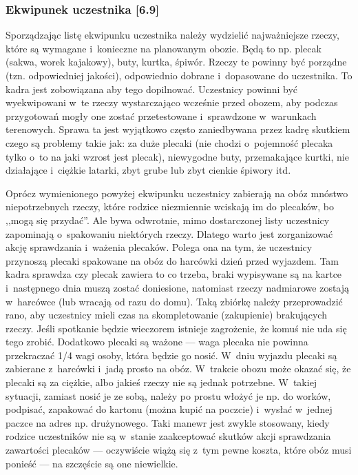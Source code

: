 \documentclass[a5paper,10pt,titlepage,twoside]{article}
\begin{document}
\subsubsection{Ekwipunek uczestnika [6.9]}
Sporządzając listę ekwipunku uczestnika należy wydzielić najważniejsze rzeczy, które są wymagane i~konieczne na planowanym obozie. Będą to np. plecak (sakwa, worek kajakowy), buty, kurtka, śpiwór. Rzeczy te powinny być porządne (tzn. odpowiedniej jakości), odpowiednio dobrane i~dopasowane do uczestnika. To kadra jest zobowiązana aby tego dopilnować. Uczestnicy powinni być wyekwipowani w~te rzeczy wystarczająco wcześnie przed obozem, aby podczas przygotowań mogły one zostać przetestowane i~sprawdzone w~warunkach terenowych. Sprawa ta jest wyjątkowo często zaniedbywana przez kadrę skutkiem czego są problemy takie jak: za duże plecaki (nie chodzi o~pojemność plecaka tylko o~to na jaki wzrost jest plecak), niewygodne buty, przemakające kurtki, nie działające i~ciężkie latarki, zbyt grube lub zbyt cienkie śpiwory itd.

Oprócz wymienionego powyżej ekwipunku uczestnicy zabierają na obóz mnóstwo niepotrzebnych rzeczy, które rodzice niezmiennie wciskają im do plecaków, bo ,,mogą się przydać''. Ale bywa odwrotnie, mimo dostarczonej listy uczestnicy zapominają o~spakowaniu niektórych rzeczy. Dlatego warto jest zorganizować akcję sprawdzania i~ważenia plecaków. Polega ona na tym, że uczestnicy przynoszą plecaki spakowane na obóz do harcówki dzień przed wyjazdem. Tam kadra sprawdza czy plecak zawiera to co trzeba, braki wypisywane są na kartce i~następnego dnia muszą zostać doniesione, natomiast rzeczy nadmiarowe zostają w~harcówce (lub wracają od razu do domu). Taką zbiórkę należy przeprowadzić rano, aby uczestnicy mieli czas na skompletowanie (zakupienie) brakujących rzeczy. Jeśli spotkanie będzie wieczorem istnieje zagrożenie, że komuś nie uda się tego zrobić. Dodatkowo plecaki są ważone --- waga plecaka nie powinna przekraczać 1/4 wagi osoby, która będzie go nosić. W~dniu wyjazdu plecaki są zabierane z~harcówki i~jadą prosto na obóz. W~trakcie obozu może okazać się, że plecaki są za ciężkie, albo jakieś rzeczy nie są jednak potrzebne. W~takiej sytuacji, zamiast nosić je ze sobą, należy po prostu włożyć je np. do worków, podpisać, zapakować do kartonu (można kupić na poczcie) i~wysłać w~jednej paczce na adres np. drużynowego. Taki manewr jest zwykle stosowany, kiedy rodzice uczestników nie są w~stanie zaakceptować skutków akcji sprawdzania zawartości plecaków --- oczywiście wiążą się z~tym pewne koszta, które obóz musi ponieść --- na szczęście są one niewielkie.
\end{document}
